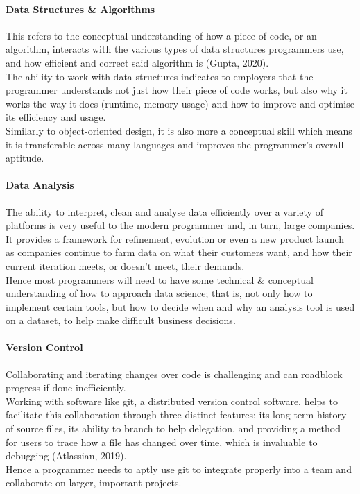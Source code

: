 \documentclass[a4paper, 11pt]{report}
\begin{document}
	\paragraph{Data Structures \& Algorithms} This refers to the conceptual understanding of how a piece of code, or an algorithm, interacts with the various types of data structures programmers use, and how efficient and correct said algorithm is (Gupta, 2020). 
	\\The ability to work with data structures indicates to employers that the programmer understands not just how their piece of code works, but also why it works the way it does (runtime, memory usage) and how to improve and optimise its efficiency and usage. 
	\\Similarly to object-oriented design, it is also more a conceptual skill which means it is transferable across many languages and improves the programmer's overall aptitude.
	
	\paragraph{Data Analysis} The ability to interpret, clean and analyse data efficiently over a variety of platforms is very useful to the modern programmer and, in turn, large companies. 
	\\It provides a framework for refinement, evolution or even a new product launch as companies continue to farm data on what their customers want, and how their current iteration meets, or doesn't meet, their demands. 
	\\Hence most programmers will need to have some technical \& conceptual understanding of how to approach data science; that is, not only how to implement certain tools, but how to decide when and why an analysis tool is used on a dataset, to help make difficult business decisions.
	
	\paragraph{Version Control} Collaborating and iterating changes over code is challenging and can roadblock progress if done inefficiently. 
	\\Working with software like git, a distributed version control software, helps to facilitate this collaboration through three distinct features; its long-term history of source files, its ability to branch to help delegation, and providing a method for users to trace how a file has changed over time, which is invaluable to debugging (Atlassian, 2019). 
	\\Hence a programmer needs to aptly use git to integrate properly into a team and collaborate on larger, important projects.
	
\end{document}

